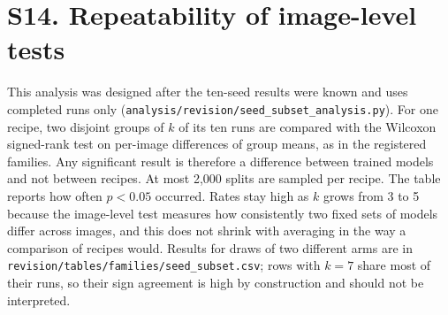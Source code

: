 \documentclass[10pt]{article}
\begin{document}
\begin{table}[ht]\centering
\resizebox{0.9\linewidth}{!}{}
\caption{What distillation and the gate do. Inference only, post hoc, seeds 1--3. Average precision (AP) against the union boundary target on up to 300 test images per dataset; readouts are closed-form ridge fits on validation pixels. Distilled arms: BDS-Lite and its variants without the surface loss or the gate. Undistilled arms: decoder-only and BDS-Lite without distillation. Gate structure uses 96 test images per dataset. Scripts: \texttt{analysis/revision/boundary\_transfer\_probe.py}, \texttt{gate\_structure.py}.}
\end{table}

\clearpage
\section*{S14. Repeatability of image-level tests}
This analysis was designed after the ten-seed results were known and uses completed runs only (\texttt{analysis/revision/seed\_subset\_analysis.py}). For one recipe, two disjoint groups of $k$ of its ten runs are compared with the Wilcoxon signed-rank test on per-image differences of group means, as in the registered families. Any significant result is therefore a difference between trained models and not between recipes. At most 2,000 splits are sampled per recipe. The table reports how often $p<0.05$ occurred. Rates stay high as $k$ grows from 3 to 5 because the image-level test measures how consistently two fixed sets of models differ across images, and this does not shrink with averaging in the way a comparison of recipes would. Results for draws of two different arms are in \texttt{revision/tables/families/seed\_subset.csv}; rows with $k=7$ share most of their runs, so their sign agreement is high by construction and should not be interpreted.
\begin{table}[ht]\centering\small

\caption{Same-recipe comparisons on the ISIC2018 official test set.}
\end{table}
\end{document}

